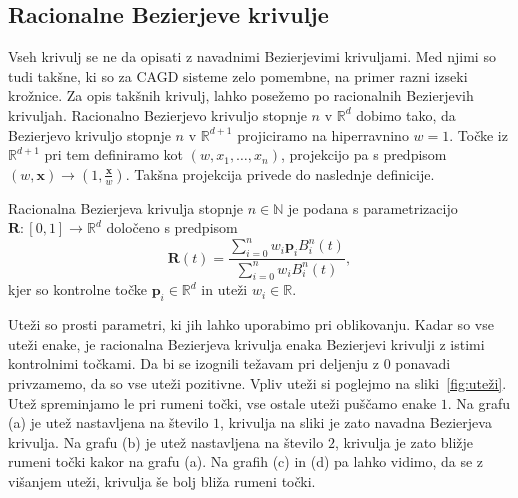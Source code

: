 \documentclass[isrm2, tisk]{fmfdelo}
\newcommand{\R}{\mathbb R}
\newcommand{\N}{\mathbb N}
\newcommand{\p}{\textbf{p}}
\begin{document}
    \subsection{Racionalne Bezierjeve krivulje}
    Vseh krivulj se ne da opisati z navadnimi Bezierjevimi krivuljami.
    Med njimi so tudi takšne, ki so za CAGD sisteme zelo pomembne, na primer razni izseki krožnice.
    Za opis takšnih krivulj, lahko posežemo po racionalnih Bezierjevih krivuljah.
    Racionalno Bezierjevo krivuljo stopnje $n$ v $\R^d$ dobimo tako, da Bezierjevo krivuljo stopnje $n$ v $\R^{d+1}$ projiciramo na hiperravnino $w=1$.
    Točke iz $\R^{d+1}$ pri tem definiramo kot $(w,x_1,\ldots,x_n)$, projekcijo pa s predpisom $(w,\mathbf{x})\to(1,\frac{\mathbf{x}}{w})$.
    Takšna projekcija privede do naslednje definicije.
    \begin{definicija}
        \label{def:racionalna}
        Racionalna Bezierjeva krivulja stopnje $n\in\N$ je podana s parametrizacijo $\mathbf{R}:[0,1]\to \R^d$  določeno s predpisom \[\mathbf{R}(t) = \frac{\sum^{n}_{i=0}w_i\p_i B^n_i(t)}{\sum^{n}_{i=0}w_i B^n_i(t)},\] kjer so kontrolne točke $\p_i\in\R^d$ in uteži $w_i\in\R$.
    \end{definicija}
    Uteži so prosti parametri, ki jih lahko uporabimo pri oblikovanju.
    Kadar so vse uteži enake, je racionalna Bezierjeva krivulja enaka Bezierjevi krivulji z istimi kontrolnimi točkami.
    Da bi se izognili težavam pri deljenju z $0$ ponavadi privzamemo, da so vse uteži pozitivne.
    Vpliv uteži si poglejmo na sliki~\ref{fig:uteži}.
    Utež spreminjamo le pri rumeni točki, vse ostale uteži puščamo enake $1$.
    Na grafu (a) je utež nastavljena na število $1$, krivulja na sliki je zato navadna Bezierjeva krivulja.
    Na grafu (b) je utež nastavljena na število $2$, krivulja je zato bližje rumeni točki kakor na grafu (a).
    Na grafih (c) in (d) pa lahko vidimo, da se z višanjem uteži, krivulja še bolj bliža rumeni točki.
\end{document}
